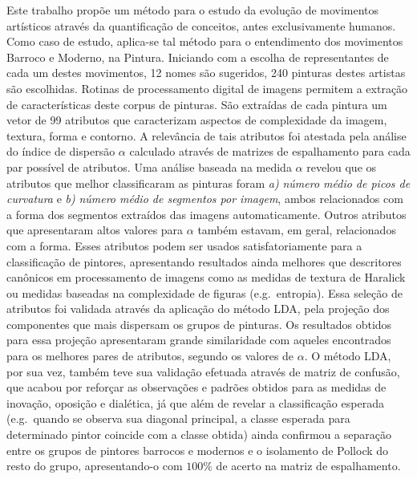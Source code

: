 

Este trabalho propõe um método para o estudo da evolução de movimentos
artísticos através da quantificação de conceitos, antes exclusivamente
humanos. Como caso de estudo, aplica-se tal método para o entendimento dos
movimentos Barroco e Moderno, na Pintura. Iniciando com a escolha de
representantes de cada um destes movimentos, 12 nomes são sugeridos, 240
pinturas destes artistas são escolhidas. Rotinas de processamento digital de
imagens permitem a extração de características deste corpus de pinturas. São
extraídas de cada pintura um vetor de 99 atributos que caracterizam aspectos de
complexidade da imagem, textura, forma e contorno.  A relevância de tais
atributos foi atestada pela análise do índice de dispersão $\alpha$ calculado
através de matrizes de espalhamento para cada par possível de atributos. Uma
análise baseada na medida $\alpha$ revelou que os atributos que melhor
classificaram as pinturas foram \textit{a)} \emph{número médio de picos de
  curvatura} e \textit{b)} \emph{número médio de segmentos por imagem}, ambos
relacionados com a forma dos segmentos extraídos das imagens
automaticamente. Outros atributos que apresentaram altos valores para $\alpha$
também estavam, em geral, relacionados com a forma. Esses atributos podem ser
usados satisfatoriamente para a classificação de pintores, apresentando
resultados ainda melhores que descritores canônicos em processamento de imagens
como as medidas de textura de Haralick ou medidas baseadas na complexidade de
figuras (e.g.\ entropia). Essa seleção de atributos foi validada através da
aplicação do método LDA, pela projeção dos componentes que mais dispersam
os grupos de pinturas. Os resultados obtidos para essa projeção apresentaram
grande similaridade com aqueles encontrados para os melhores pares de atributos,
segundo os valores de $\alpha$. O método LDA, por sua vez, também teve sua validação
efetuada através de matriz de confusão, que acabou por reforçar as observações e
padrões obtidos para as medidas de inovação, oposição e dialética, já que além
de revelar a classificação esperada (e.g.\ quando se observa sua diagonal
principal, a classe esperada para determinado pintor coincide com a classe
obtida) ainda confirmou a separação entre os grupos de pintores barrocos e
modernos e o isolamento de Pollock do resto do grupo, apresentando-o com $100\%$
de acerto na matriz de espalhamento.

